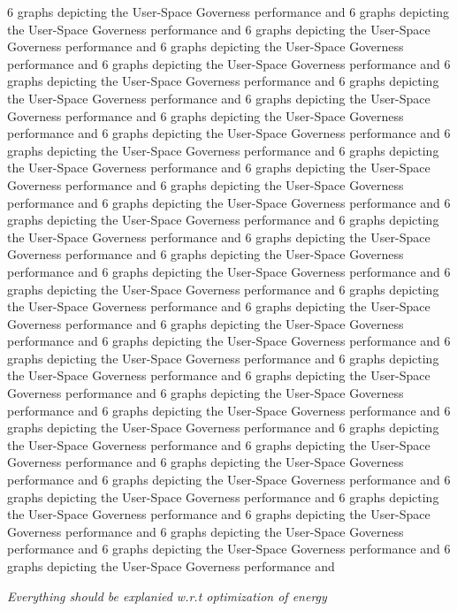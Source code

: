 6 graphs depicting the User-Space Governess performance and 
6 graphs depicting the User-Space Governess performance and 
6 graphs depicting the User-Space Governess performance and 
6 graphs depicting the User-Space Governess performance and 
6 graphs depicting the User-Space Governess performance and 
6 graphs depicting the User-Space Governess performance and 
6 graphs depicting the User-Space Governess performance and 
6 graphs depicting the User-Space Governess performance and 
6 graphs depicting the User-Space Governess performance and 
6 graphs depicting the User-Space Governess performance and 
6 graphs depicting the User-Space Governess performance and 
6 graphs depicting the User-Space Governess performance and 
6 graphs depicting the User-Space Governess performance and 
6 graphs depicting the User-Space Governess performance and 
6 graphs depicting the User-Space Governess performance and 
6 graphs depicting the User-Space Governess performance and 
6 graphs depicting the User-Space Governess performance and 
6 graphs depicting the User-Space Governess performance and 
6 graphs depicting the User-Space Governess performance and 
6 graphs depicting the User-Space Governess performance and 
6 graphs depicting the User-Space Governess performance and 
6 graphs depicting the User-Space Governess performance and 
6 graphs depicting the User-Space Governess performance and 
6 graphs depicting the User-Space Governess performance and 
6 graphs depicting the User-Space Governess performance and 
6 graphs depicting the User-Space Governess performance and 
6 graphs depicting the User-Space Governess performance and 
6 graphs depicting the User-Space Governess performance and 
6 graphs depicting the User-Space Governess performance and 
6 graphs depicting the User-Space Governess performance and 
6 graphs depicting the User-Space Governess performance and 
6 graphs depicting the User-Space Governess performance and 
6 graphs depicting the User-Space Governess performance and 
6 graphs depicting the User-Space Governess performance and 
6 graphs depicting the User-Space Governess performance and 
6 graphs depicting the User-Space Governess performance and 
6 graphs depicting the User-Space Governess performance and 
6 graphs depicting the User-Space Governess performance and 
6 graphs depicting the User-Space Governess performance and 
6 graphs depicting the User-Space Governess performance and 
6 graphs depicting the User-Space Governess performance and 

\emph{Everything should be explanied w.r.t optimization of energy}
